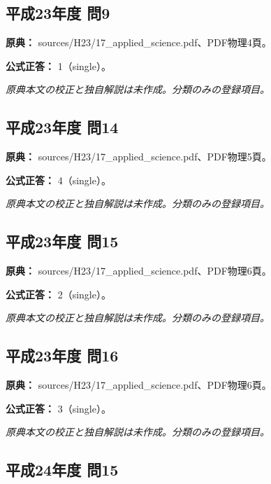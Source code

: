 \subsection{平成23年度 問9}
\label{q:h23-reg-applied-09}

\noindent\textbf{原典：} sources/H23/17\_applied\_science.pdf、PDF物理4頁。

\textbf{公式正答：} 1（single）。

\par\textit{原典本文の校正と独自解説は未作成。分類のみの登録項目。}

\subsection{平成23年度 問14}
\label{q:h23-reg-applied-14}

\noindent\textbf{原典：} sources/H23/17\_applied\_science.pdf、PDF物理5頁。

\textbf{公式正答：} 4（single）。

\par\textit{原典本文の校正と独自解説は未作成。分類のみの登録項目。}

\subsection{平成23年度 問15}
\label{q:h23-reg-applied-15}

\noindent\textbf{原典：} sources/H23/17\_applied\_science.pdf、PDF物理6頁。

\textbf{公式正答：} 2（single）。

\par\textit{原典本文の校正と独自解説は未作成。分類のみの登録項目。}

\subsection{平成23年度 問16}
\label{q:h23-reg-applied-16}

\noindent\textbf{原典：} sources/H23/17\_applied\_science.pdf、PDF物理6頁。

\textbf{公式正答：} 3（single）。

\par\textit{原典本文の校正と独自解説は未作成。分類のみの登録項目。}

\subsection{平成24年度 問15}
\label{q:h24-reg-applied-15}

